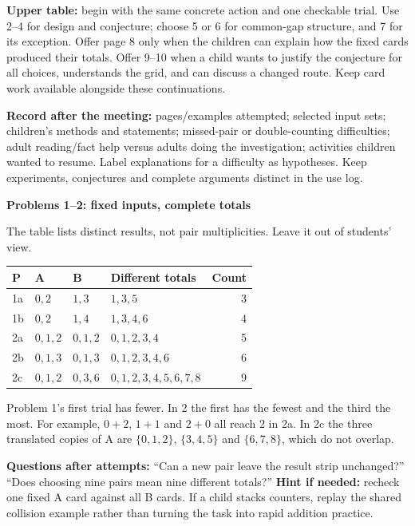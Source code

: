 \documentclass[11pt]{article}
\newcommand{\heading}[1]{\vspace{4pt}{\large\bfseries #1}\par}
\newcommand{\sub}[1]{\textbf{#1}\par}
\newcommand{\sset}[1]{\{#1\}}
\newcommand{\smalltable}{\small\renewcommand{\arraystretch}{1.2}}
\begin{document}
\textbf{Upper table:} begin with the same concrete action and one checkable trial. Use 2--4 for design and conjecture; choose 5 or 6 for common-gap structure, and 7 for its exception. Offer page 8 only when the children can explain how the fixed cards produced their totals. Offer 9--10 when a child wants to justify the conjecture for all choices, understands the grid, and can discuss a changed route. Keep card work available alongside these continuations.

\textbf{Record after the meeting:} pages/examples attempted; selected input sets; children's methods and statements; missed-pair or double-counting difficulties; adult reading/fact help versus adults doing the investigation; activities children wanted to resume. Label explanations for a difficulty as hypotheses. Keep experiments, conjectures and complete arguments distinct in the use log.
\newpage

\heading{Problems 1--4: collisions, design and a size conjecture}
\sub{Problems 1--2: fixed inputs, complete totals}
The table lists distinct results, not pair multiplicities. Leave it out of students' view.

{\smalltable
\begin{tabularx}{\linewidth}{@{}p{12mm}p{32mm}p{32mm}Xr@{}}
\toprule
P & A & B & Different totals & Count\\\midrule
1a & $0,2$ & $1,3$ & $1,3,5$ & 3\\
1b & $0,2$ & $1,4$ & $1,3,4,6$ & 4\\
2a & $0,1,2$ & $0,1,2$ & $0,1,2,3,4$ & 5\\
2b & $0,1,3$ & $0,1,3$ & $0,1,2,3,4,6$ & 6\\
2c & $0,1,2$ & $0,3,6$ & $0,1,2,3,4,5,6,7,8$ & 9\\\bottomrule
\end{tabularx}}

Problem 1's first trial has fewer. In 2 the first has the fewest and the third the most. For example, $0+2$, $1+1$ and $2+0$ all reach 2 in 2a. In 2c the three translated copies of A are $\sset{0,1,2}$, $\sset{3,4,5}$ and $\sset{6,7,8}$, which do not overlap.

\textbf{Questions after attempts:} ``Can a new pair leave the result strip unchanged?'' ``Does choosing nine pairs mean nine different totals?'' \textbf{Hint if needed:} recheck one fixed A card against all B cards. If a child stacks counters, replay the shared collision example rather than turning the task into rapid addition practice.
\end{document}
